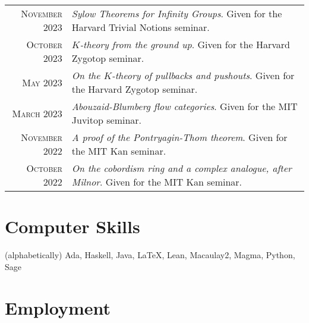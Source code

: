 \documentclass[a4paper,10pt]{article} %
\begin{document}
\begin{tabular}{rl}

\textsc{November} 2023 & \emph{Sylow Theorems for Infinity Groups}. Given for the Harvard Trivial Notions seminar.\\

\textsc{October} 2023 & \emph{$K$-theory from the ground up}. Given for the Harvard Zygotop seminar.\\

\textsc{May} 2023 & \emph{On the $K$-theory of pullbacks and pushouts}. Given for the Harvard Zygotop seminar.\\

\textsc{March} 2023 & \emph{Abouzaid-Blumberg flow categories}. Given for the MIT Juvitop seminar.\\

\textsc{November} 2022 & \emph{A proof of the Pontryagin-Thom theorem}. Given for the MIT Kan seminar.\\

\textsc{October} 2022 & \emph{On the cobordism ring and a complex analogue, after Milnor}. Given for the MIT Kan seminar.

\end{tabular}



\section{Computer Skills}

(alphabetically) Ada, Haskell, Java, {\fb \LaTeX}, Lean, Macaulay2, Magma, Python, Sage


\section{Employment}
\end{document}
